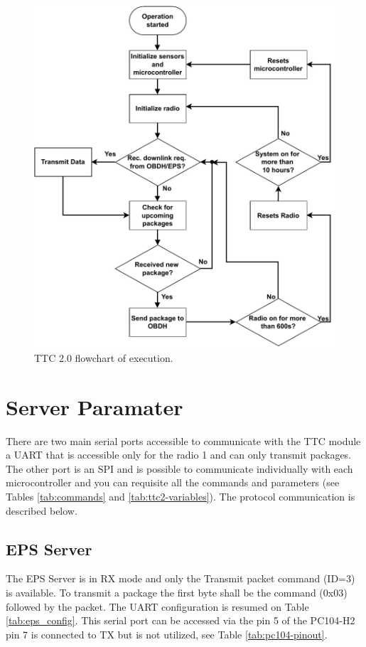 \begin{figure}[!ht]
    \begin{center}
        \includegraphics[width=\textwidth]{figures/ttc2-flowchart.pdf}
        \caption{TTC 2.0 flowchart of execution.}
        \label{fig:ttc_flowchart}
    \end{center}
\end{figure}

\section{Server Paramater}

There are two main serial ports accessible to communicate with the TTC module a UART that is accessible only for the radio 1 and can only transmit packages. The other port is an SPI and is possible to communicate individually with each microcontroller and you can requisite all the commands and parameters (see Tables \ref{tab:commands} and \ref{tab:ttc2-variables}). The protocol communication is described below.

\subsection{EPS Server}
The EPS Server is in RX mode and only the Transmit packet command (ID=3) is available. To transmit a package the first byte shall be the command (0x03) followed by the packet. The UART configuration is resumed on Table \ref{tab:eps_config}. This serial port can be accessed via the pin 5 of the PC104-H2 pin 7 is connected to TX but is not utilized, see Table \ref{tab:pc104-pinout}.


